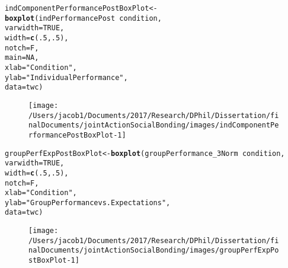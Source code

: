 \documentclass[english]{article}\usepackage[]{graphicx}\usepackage[]{color}
\makeatletter
\def\maxwidth{ %
  \ifdim\Gin@nat@width>\linewidth
    \linewidth
  \else
    \Gin@nat@width
  \fi
}
\newcommand{\hlnum}[1]{\textcolor[rgb]{0.686,0.059,0.569}{#1}}%
\newcommand{\hlstr}[1]{\textcolor[rgb]{0.192,0.494,0.8}{#1}}%
\newcommand{\hlopt}[1]{\textcolor[rgb]{0,0,0}{#1}}%
\newcommand{\hlstd}[1]{\textcolor[rgb]{0.345,0.345,0.345}{#1}}%
\newcommand{\hlkwb}[1]{\textcolor[rgb]{0.69,0.353,0.396}{#1}}%
\newcommand{\hlkwc}[1]{\textcolor[rgb]{0.333,0.667,0.333}{#1}}%
\newcommand{\hlkwd}[1]{\textcolor[rgb]{0.737,0.353,0.396}{\textbf{#1}}}%
\newenvironment{kframe}{%
 \def\at@end@of@kframe{}%
 \ifinner\ifhmode%
  \def\at@end@of@kframe{\end{minipage}}%
  \begin{minipage}{\columnwidth}%
 \fi\fi%
 \def\FrameCommand##1{\hskip\@totalleftmargin \hskip-\fboxsep
 \colorbox{shadecolor}{##1}\hskip-\fboxsep
     \hskip-\linewidth \hskip-\@totalleftmargin \hskip\columnwidth}%
 \MakeFramed {\advance\hsize-\width
   \@totalleftmargin\z@ \linewidth\hsize
   \@setminipage}}%
 {\par\unskip\endMakeFramed%
 \at@end@of@kframe}
\newenvironment{knitrout}{}{} %
\makeatother
\begin{document}
\begin{knitrout}
\color{fgcolor}\begin{kframe}
\begin{alltt}
  \hlstd{indComponentPerformancePostBoxPlot} \hlkwb{<-} \hlkwd{boxplot}\hlstd{(indPerformancePost} \hlopt{~} \hlstd{condition,}
                                          \hlkwc{varwidth} \hlstd{=} \hlnum{TRUE}\hlstd{,}
                                          \hlkwc{width} \hlstd{=} \hlkwd{c}\hlstd{(}\hlnum{.5}\hlstd{,}\hlnum{.5}\hlstd{),}
                                          \hlkwc{notch} \hlstd{= F,}
                                          \hlkwc{main} \hlstd{=} \hlnum{NA}\hlstd{,}
                                          \hlkwc{xlab} \hlstd{=} \hlstr{"Condition"}\hlstd{,}
                                          \hlkwc{ylab} \hlstd{=} \hlstr{"Individual Performance"}\hlstd{,}
                                          \hlkwc{data} \hlstd{= twc)}
\end{alltt}
\end{kframe}\begin{figure}

{\centering \texttt{[image: /Users/jacob1/Documents/2017/Research/DPhil/Dissertation/finalDocuments/jointActionSocialBonding/images/indComponentPerformancePostBoxPlot-1]} 

}

\end{figure}


\end{knitrout}
\begin{knitrout}
\color{fgcolor}\begin{kframe}
\begin{alltt}
  \hlstd{groupPerfExpPostBoxPlot} \hlkwb{<-} \hlkwd{boxplot}\hlstd{(groupPerformance_3Norm} \hlopt{~} \hlstd{condition,}
                                          \hlkwc{varwidth} \hlstd{=} \hlnum{TRUE}\hlstd{,}
                                          \hlkwc{width} \hlstd{=} \hlkwd{c}\hlstd{(}\hlnum{.5}\hlstd{,}\hlnum{.5}\hlstd{),}
                                          \hlkwc{notch} \hlstd{= F,}
                                          \hlkwc{xlab} \hlstd{=} \hlstr{"Condition"}\hlstd{,}
                                          \hlkwc{ylab} \hlstd{=} \hlstr{"Group Performance vs. Expectations"}\hlstd{,}
                                          \hlkwc{data} \hlstd{= twc)}
\end{alltt}
\end{kframe}\begin{figure}

{\centering \texttt{[image: /Users/jacob1/Documents/2017/Research/DPhil/Dissertation/finalDocuments/jointActionSocialBonding/images/groupPerfExpPostBoxPlot-1]} 

}

\end{figure}


\end{knitrout}
\end{document}
